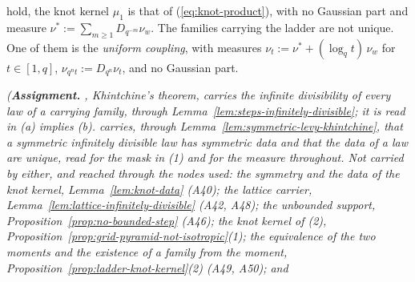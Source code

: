 \begin{proposition}
\begin{enumerate}
hold, the knot
kernel $\mu_1$ is that of
(\ref{eq:knot-product}), with no Gaussian part and \Levy{} measure $\nu^* := \sum_{m \ge 1}
D_{q^{-m}}\nu_w$. The families carrying the ladder are not unique. One of them is the
\emph{uniform coupling}, with \Levy{} measures $\nu_t := \nu^* + (\log_qt)\,\nu_w$ for
$t \in [1, q]$, $\nu_{q^nt} := D_{q^n}\nu_t$, and no Gaussian part.
\end{enumerate}
\statusA\quad{}\quad{}\quad\emph{(\textbf{Assignment.} ,
Khintchine's theorem, carries the infinite divisibility of every law of a carrying family, through
Lemma~\ref{lem:steps-infinitely-divisible}; it is read in (a) implies (b).
 carries, through Lemma~\ref{lem:symmetric-levy-khintchine}, that a symmetric
infinitely divisible law has symmetric data and that the data of a law are unique, read for the
mask in (1) and for the \Levy{} measure throughout. Not carried by either, and reached through the
nodes used: the symmetry and the data of the knot kernel, Lemma~\ref{lem:knot-data} (A40); the lattice carrier, Lemma~\ref{lem:lattice-infinitely-divisible} (A42, A48); the unbounded
support, Proposition~\ref{prop:no-bounded-step} (A46); the knot kernel of (2),
Proposition~\ref{prop:grid-pyramid-not-isotropic}(1); the equivalence of the two moments and the
existence of a family from the moment, Proposition~\ref{prop:ladder-knot-kernel}(2) (A49, A50); and
}
\end{proposition}
